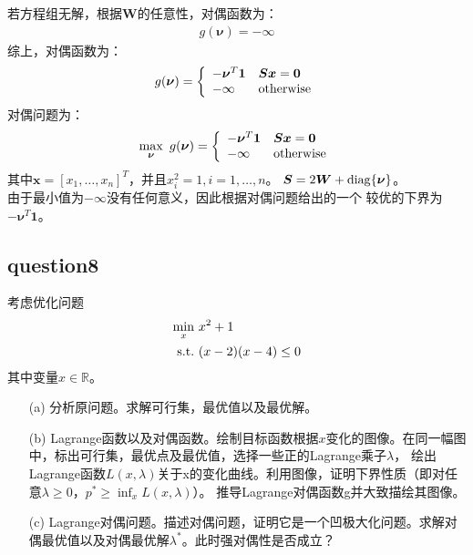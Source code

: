 \documentclass[12pt,a4paper]{ctexart}
\begin{document}
若方程组无解，根据$\boldsymbol{W}$的任意性，对偶函数为：
\begin{align*}
    g(\boldsymbol{\nu})= -\infty
\end{align*}
综上，对偶函数为：
\begin{align*}
g(\boldsymbol{\nu})=\left \{
\begin{array}{ll}
    -\boldsymbol{\nu}^T\boldsymbol{1} & \boldsymbol{Sx}=\boldsymbol{0}\\
    -\infty  & \rm{otherwise}
\end{array}
\right .
\end{align*}
对偶问题为：
\begin{align*}
\max\limits_{\boldsymbol{\nu}}\ g(\boldsymbol{\nu})=\left \{
\begin{array}{ll}
    -\boldsymbol{\nu}^T\boldsymbol{1} & \boldsymbol{Sx}=\boldsymbol{0}\\
    -\infty  & \rm{otherwise}
\end{array}
\right .
\end{align*}
其中$\boldsymbol{x}=[x_1,\ldots,x_n]^T$，并且$x_i^2=1,i=1,\ldots,n$。
$\boldsymbol{S}=2\boldsymbol{W}+\rm{diag}\{\boldsymbol{\nu}\}$。\\
由于最小值为$-\infty$没有任何意义，因此根据对偶问题给出的一个
较优的下界为$-\boldsymbol{\nu}^T\boldsymbol{1}$。

\subsection*{question8}
考虑优化问题
\begin{align*}
    \min\limits_{x}\  &x^2+1\\
    \rm{s.t.}\  &(x-2)(x-4) \leq 0
\end{align*}
其中变量$x \in \mathbb{R}$。
\begin{itemize}
    \item[(a)] 分析原问题。求解可行集，最优值以及最优解。
    \item[(b)] Lagrange函数以及对偶函数。绘制目标函数根据$x$变化的图像。在同一幅图中，标出可行集，最优点及最优值，选择一些正的Lagrange乘子$\lambda$，
    绘出Lagrange函数$L(x,\lambda)$关于x的变化曲线。利用图像，证明下界性质（即对任意$\lambda \geq 0$，$p^* \geq \inf_xL(x,\lambda)$）。
    推导Lagrange对偶函数g并大致描绘其图像。
    \item[(c)]Lagrange对偶问题。描述对偶问题，证明它是一个凹极大化问题。求解对偶最优值以及对偶最优解$\lambda^*$。此时强对偶性是否成立？
\end{itemize}
\newpage
\end{document}
